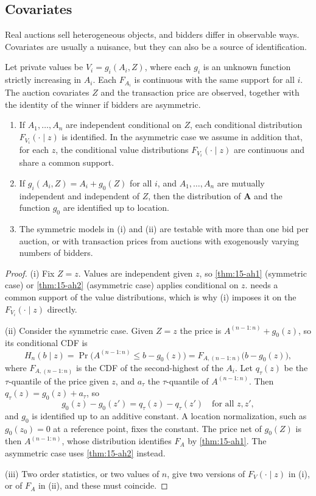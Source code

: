 \subsection{Covariates}\label{sec:15-covariates}

Real auctions sell heterogeneous objects, and bidders differ in observable ways. Covariates are usually a nuisance,
but they can also be a source of identification.

\begin{theorem}\label{thm:15-ah3}
Let private values be $V_i=g_i(A_i,Z)$, where each $g_i$ is an unknown function strictly increasing in $A_i$. Each
$F_{A_i}$ is continuous with the same support for all $i$. The auction covariates $Z$ and the transaction price are
observed, together with the identity of the winner if bidders are asymmetric.
\begin{enumerate}[label=(\roman*)]
\item If $A_1,\dots,A_n$ are independent conditional on $Z$, each conditional distribution $F_{V_i}(\cdot\mid z)$ is
identified. In the asymmetric case we assume in addition that, for each $z$, the conditional value
distributions $F_{V_i}(\cdot\mid z)$ are continuous and share a common support.
\item If $g_i(A_i,Z)=A_i+g_0(Z)$ for all $i$, and $A_1,\dots,A_n$ are mutually independent and independent of $Z$, then
the distribution of $\bm A$ and the function $g_0$ are identified up to location.
\item The symmetric models in (i) and (ii) are testable with more than one bid per auction, or with transaction
prices from auctions with exogenously varying numbers of bidders.
\end{enumerate}
\end{theorem}

\begin{proof}
(i) Fix $Z=z$. Values are independent given $z$, so \cref{thm:15-ah1} (symmetric case) or \cref{thm:15-ah2}
(asymmetric case) applies conditional on $z$.  needs a common support of the value distributions,
which is why (i) imposes it on the $F_{V_i}(\cdot\mid z)$ directly.

(ii) Consider the symmetric case. Given $Z=z$ the price is $A^{(n-1:n)}+g_0(z)$, so its conditional CDF is
\[
H_n(b\mid z)=\Pr\big(A^{(n-1:n)}\le b-g_0(z)\big)=F_{A,(n-1:n)}\big(b-g_0(z)\big),
\]
where $F_{A,(n-1:n)}$ is the CDF of the second-highest of the $A_i$. Let $q_\tau(z)$ be the $\tau$-quantile of the
price given $z$, and $a_\tau$ the $\tau$-quantile of $A^{(n-1:n)}$. Then $q_\tau(z)=g_0(z)+a_\tau$, so
\[
g_0(z)-g_0(z')=q_\tau(z)-q_\tau(z')\quad\text{for all }z,z' ,
\]
and $g_0$ is identified up to an additive constant. A location normalization, such as $g_0(z_0)=0$ at a reference
point, fixes the constant. The price net of $g_0(Z)$ is then $A^{(n-1:n)}$, whose distribution identifies $F_A$ by
\cref{thm:15-ah1}. The asymmetric case uses \cref{thm:15-ah2} instead.

(iii) Two order statistics, or two values of $n$, give two versions of $F_{V}(\cdot\mid z)$ in (i), or of $F_A$ in
(ii), and these must coincide.
\end{proof}

